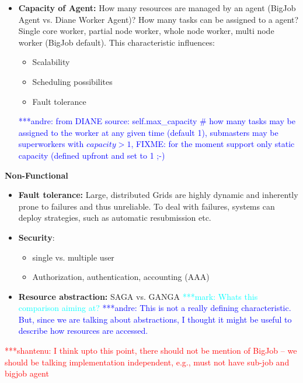 \documentclass[]{article}
\newcommand{\jhanote}[1]{ {\textcolor{red} { ***shantenu: #1 }}}
\newcommand{\alnote}[1]{ {\textcolor{blue} { ***andre: #1 }}}
\newcommand{\msnote}[1]{ {\textcolor{cyan} { ***mark: #1 }}}
\newcommand{\alnote}[1]{}
\begin{document}
\begin{itemize}
\begin{itemize}
	\item \textbf{Capacity of Agent:} How many resources are managed by an agent (BigJob Agent vs. Diane Worker Agent)? How many tasks can be assigned to a agent? Single core worker, partial node worker, whole node worker, multi node worker (BigJob
default). This characteristic influences: 
    \begin{itemize}
        \item Scalability
        \item Scheduling possibilites
        \item Fault tolerance
    \end{itemize}
    \alnote{from DIANE source: self.max\_capacity \# how many tasks may be 
    assigned to the worker at any given time (default 1), submasters may be 
    superworkers with $capacity>1$, FIXME: for the moment support only static 
    capacity (defined upfront and set to 1 ;-)}    
    \end{itemize}


	
	
\end{itemize}

\textbf{Non-Functional}

\begin{itemize}
	\item \textbf{Fault tolerance:} Large, distributed Grids are highly dynamic 
	and inherently prone to failures and thus unreliable. To deal with failures, 
	systems can deploy strategies, such as automatic resubmission etc.
	\item \textbf{Security}: 
	\begin{itemize}
	   \item single vs. multiple user
	   \item Authorization, authentication, accounting (AAA)
	\end{itemize}
	\item \textbf{Resource abstraction:} SAGA vs. GANGA
	\msnote{Whats this comparison aiming at?} \alnote{This is not a really 
	defining characteristic. But, since we are talking about abstractions, I 
	thought it might be useful to describe how resources are accessed.}
\end{itemize}

\jhanote{I think upto this point, there should not be mention of
  BigJob -- we should be talking implementation independent, e.g., must
  not have sub-job and bigjob agent}
\end{document}
